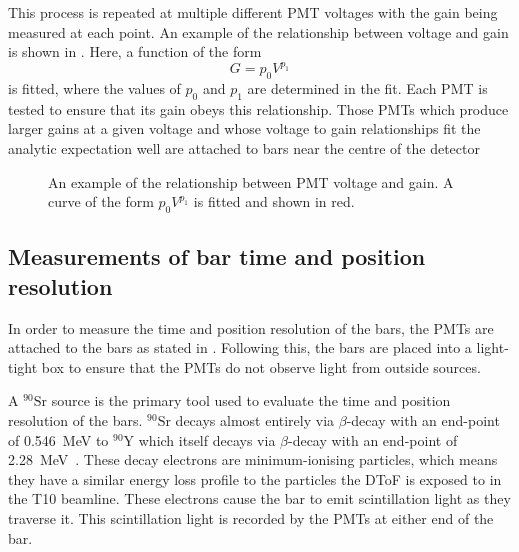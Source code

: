 This process is repeated at multiple different PMT voltages with the gain being measured at each point.
An example of the relationship between voltage and gain is shown in .
Here, a function of the form
\begin{equation}
  G = p_{0} V^{p_{1}}
  \label{eq:gain}
\end{equation}
is fitted, where the values of $p_{0}$ and $p_{1}$ are determined in the fit.
Each PMT is tested to ensure that its gain obeys this relationship.
Those PMTs which produce larger gains at a given voltage and whose voltage to gain relationships fit the analytic expectation well are attached to bars near the centre of the detector

\begin{figure}[h]
  \centering
  \begin{adjustbox}{max totalsize={.8\textwidth}, center}
    
  \end{adjustbox}
  \caption[Example of relationship between PMT voltage and gain]{An example of the relationship between PMT voltage and gain. A curve of the form $p_{0} V^{p_{1}}$ is fitted and shown in red.}
  \label{fig:gainEx}
\end{figure}

\subsection{Measurements of bar time and position resolution}
\label{sec:hptpc_dtof_characterisation:characterisation:barRes}

In order to measure the time and position resolution of the bars, the PMTs are attached to the bars as stated in .
Following this, the bars are placed into a light-tight box to ensure that the PMTs do not observe light from outside sources.

A $^{90}\text{Sr}$ source is the primary tool used to evaluate the time and position resolution of the bars.
$^{90}\text{Sr}$ decays almost entirely via $\beta$-decay with an end-point of \SI{0.546}{\mega\electronvolt} to $^{90}\text{Y}$ which itself decays via $\beta$-decay with an end-point of \SI{2.28}{\mega\electronvolt}~\cite{strontium}.
These decay electrons are minimum-ionising particles, which means they have a similar energy loss profile to the particles the DToF is exposed to in the T10 beamline.
These electrons cause the bar to emit scintillation light as they traverse it.
This scintillation light is recorded by the PMTs at either end of the bar.

